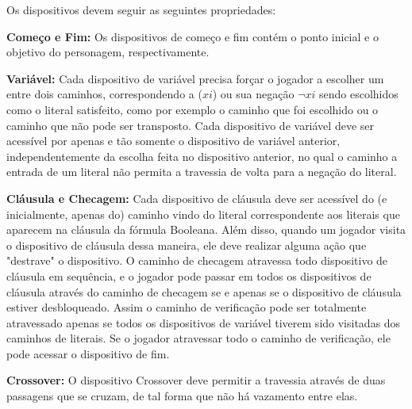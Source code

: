 Os dispositivos devem seguir as seguintes propriedades:

\textbf{Começo e Fim: } Os dispositivos de começo e fim contém o ponto inicial e o objetivo do personagem, respectivamente.

\textbf{Variável: }Cada dispositivo de variável precisa forçar o jogador a escolher um entre dois caminhos, correspondendo
a (\(xi\)) ou sua negação \(\lnot xi\) sendo escolhidos como o literal satisfeito, como por exemplo o caminho que foi escolhido ou o
caminho que não pode ser transposto. Cada dispositivo de variável deve ser acessível por apenas e tão somente o dispositivo de 
variável anterior, independentemente da escolha feita no dispositivo anterior, no qual o caminho a entrada de um literal não
permita a travessia de volta para a negação do literal.

\textbf{Cláusula e Checagem: }Cada dispositivo de cláusula deve ser acessível do (e inicialmente, apenas do) caminho vindo do
literal correspondente aos literais que aparecem na cláusula da fórmula Booleana. Além disso, quando um jogador
visita o dispositivo de cláusula dessa maneira, ele deve realizar alguma ação que "destrave" o dispositivo. O caminho de checagem
atravessa todo dispositivo de cláusula em sequência, e o jogador pode passar em todos os dispositivos de cláusula através do 
caminho de checagem se e apenas se o dispositivo de cláusula estiver desbloqueado. Assim o caminho de verificação pode ser
totalmente atravessado apenas se todos os dispositivos de variável tiverem sido visitadas dos caminhos de literais. Se o jogador
atravessar todo o caminho de verificação, ele pode acessar o dispositivo de fim.

\textbf{Crossover: }O dispositivo Crossover deve permitir a travessia através de duas passagens que se cruzam,
de tal forma que não há vazamento entre elas.
